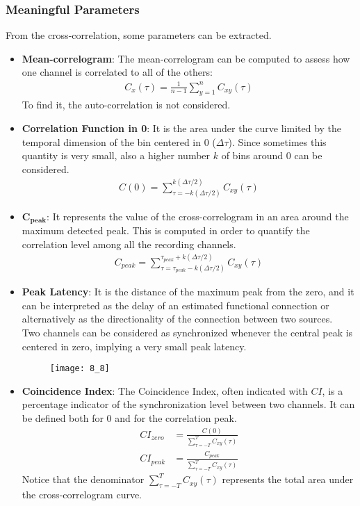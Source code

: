 \subsubsection{Meaningful Parameters}
From the cross-correlation, some parameters can be extracted.
\begin{itemize}
    \item \textbf{Mean-correlogram}: The mean-correlogram can be computed to assess how one channel is correlated to all of the others:
    \begin{align*}
        C_x(\tau)=\frac{1}{n-1}\sum_{y=1}^{n}C_{xy}(\tau)
    \end{align*}
    To find it, the auto-correlation is not considered.
    \item \textbf{Correlation Function in 0}: It is the area under the curve limited by the temporal dimension of the bin centered in 0 (\(\Delta\tau\)). Since sometimes this quantity is very small, also a higher number \(k\) of bins around 0 can be considered.
    \begin{align*}
        C(0)=\sum_{\tau=-k(\Delta\tau/2)}^{k(\Delta\tau/2)}C_{xy}(\tau)
    \end{align*}
    \item \(\mathbf{C_{peak}}\): It represents the value of the cross-correlogram in
    an area around the maximum detected peak. This is computed in order to quantify the
    correlation level among all the recording channels. 
    \begin{align*}
        C_{peak}=\sum_{\tau=\tau_{peak}-k(\Delta\tau/2)}^{\tau_{peak}+k(\Delta\tau/2)}C_{xy}(\tau)
    \end{align*}
    \item \textbf{Peak Latency}: It is the distance of the maximum peak from the zero, and it can be interpreted as the delay of an estimated functional connection or alternatively as the directionality of the connection between two sources. \\
    Two channels can be considered as synchronized whenever the central peak is centered in zero, implying a very small peak latency.
    \begin{figure}[H]
        \texttt{[image: 8\_8]}
        \centering
    \end{figure}
    \item \textbf{Coincidence Index}: The Coincidence Index, often indicated with \(CI\), is a percentage indicator of the synchronization level between two channels. It can be defined both for 0 and for the correlation peak.
    \begin{align*}
        CI_{zero} & = \frac{C(0)}{\sum_{\tau=-T}^{T}C_{xy}(\tau)}     \\
        CI_{peak} & = \frac{C_{peak}}{\sum_{\tau=-T}^{T}C_{xy}(\tau)}
    \end{align*}
    Notice that the denominator \(\sum_{\tau=-T}^{T}C_{xy}(\tau)\) represents the total
    area under the cross-correlogram curve.
\end{itemize}
